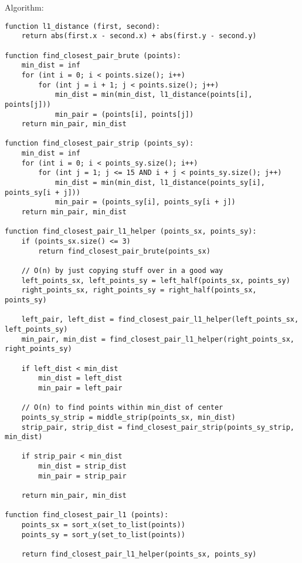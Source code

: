 \documentclass[11pt, oneside]{article}
\begin{document}
Algorithm: 
\begin{lstlisting}
function l1_distance (first, second):
    return abs(first.x - second.x) + abs(first.y - second.y)

function find_closest_pair_brute (points):
    min_dist = inf
    for (int i = 0; i < points.size(); i++)
        for (int j = i + 1; j < points.size(); j++)
            min_dist = min(min_dist, l1_distance(points[i], points[j]))
            min_pair = (points[i], points[j])
    return min_pair, min_dist

function find_closest_pair_strip (points_sy):
    min_dist = inf
    for (int i = 0; i < points_sy.size(); i++)
        for (int j = 1; j <= 15 AND i + j < points_sy.size(); j++)
            min_dist = min(min_dist, l1_distance(points_sy[i], points_sy[i + j]))
            min_pair = (points_sy[i], points_sy[i + j])
    return min_pair, min_dist

function find_closest_pair_l1_helper (points_sx, points_sy):
    if (points_sx.size() <= 3)
        return find_closest_pair_brute(points_sx)

    // O(n) by just copying stuff over in a good way
    left_points_sx, left_points_sy = left_half(points_sx, points_sy) 
    right_points_sx, right_points_sy = right_half(points_sx, points_sy)

    left_pair, left_dist = find_closest_pair_l1_helper(left_points_sx, left_points_sy)
    min_pair, min_dist = find_closest_pair_l1_helper(right_points_sx, right_points_sy)

    if left_dist < min_dist
        min_dist = left_dist
        min_pair = left_pair

    // O(n) to find points within min_dist of center
    points_sy_strip = middle_strip(points_sx, min_dist)
    strip_pair, strip_dist = find_closest_pair_strip(points_sy_strip, min_dist)

    if strip_pair < min_dist
        min_dist = strip_dist
        min_pair = strip_pair

    return min_pair, min_dist

function find_closest_pair_l1 (points):
    points_sx = sort_x(set_to_list(points))
    points_sy = sort_y(set_to_list(points))

    return find_closest_pair_l1_helper(points_sx, points_sy)
\end{lstlisting}

\clearpage

\end{document}
